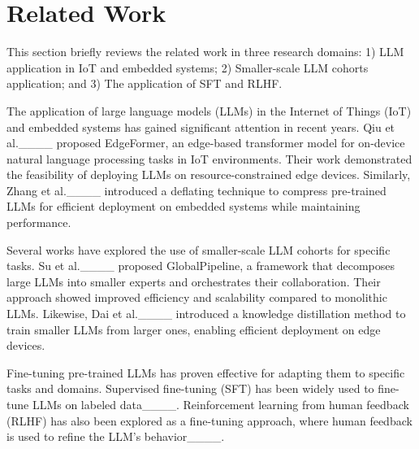 \section{Related Work}
\label{section:related-work}
This section briefly reviews the related work in three research domains: 1) LLM application in IoT and embedded systems; 2) Smaller-scale LLM cohorts application; and 3) The application of SFT and RLHF.

The application of large language models (LLMs) in the Internet of Things (IoT) and embedded systems has gained significant attention in recent years. Qiu et al.____ proposed EdgeFormer, an edge-based transformer model for on-device natural language processing tasks in IoT environments. Their work demonstrated the feasibility of deploying LLMs on resource-constrained edge devices. Similarly, Zhang et al.____ introduced a deflating technique to compress pre-trained LLMs for efficient deployment on embedded systems while maintaining performance.

Several works have explored the use of smaller-scale LLM cohorts for specific tasks. Su et al.____ proposed GlobalPipeline, a framework that decomposes large LLMs into smaller experts and orchestrates their collaboration. Their approach showed improved efficiency and scalability compared to monolithic LLMs. Likewise, Dai et al.____ introduced a knowledge distillation method to train smaller LLMs from larger ones, enabling efficient deployment on edge devices.

Fine-tuning pre-trained LLMs has proven effective for adapting them to specific tasks and domains. Supervised fine-tuning (SFT) has been widely used to fine-tune LLMs on labeled data____. Reinforcement learning from human feedback (RLHF) has also been explored as a fine-tuning approach, where human feedback is used to refine the LLM's behavior____.